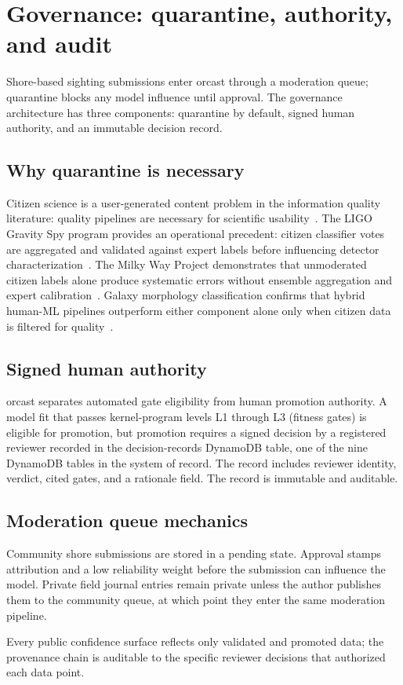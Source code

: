 \section{Governance: quarantine, authority, and audit}

Shore-based sighting submissions enter orcast through a moderation queue; quarantine blocks any model influence until approval. The governance architecture has three components: quarantine by default, signed human authority, and an immutable decision record.

\subsection{Why quarantine is necessary}

Citizen science is a user-generated content problem in the information quality literature: quality pipelines are necessary for scientific usability~\cite{arxiv190508289}. The LIGO Gravity Spy program provides an operational precedent: citizen classifier votes are aggregated and validated against expert labels before influencing detector characterization~\cite{arxiv161104596}. The Milky Way Project demonstrates that unmoderated citizen labels alone produce systematic errors without ensemble aggregation and expert calibration~\cite{arxiv14062692}. Galaxy morphology classification confirms that hybrid human-ML pipelines outperform either component alone only when citizen data is filtered for quality~\cite{arxiv14097935}.

\subsection{Signed human authority}

orcast separates automated gate eligibility from human promotion authority. A model fit that passes kernel-program levels L1 through L3 (fitness gates) is eligible for promotion, but promotion requires a signed decision by a registered reviewer recorded in the decision-records DynamoDB table, one of the nine DynamoDB tables in the system of record. The record includes reviewer identity, verdict, cited gates, and a rationale field. The record is immutable and auditable.

\subsection{Moderation queue mechanics}

Community shore submissions are stored in a pending state. Approval stamps attribution and a low reliability weight before the submission can influence the model. Private field journal entries remain private unless the author publishes them to the community queue, at which point they enter the same moderation pipeline.

Every public confidence surface reflects only validated and promoted data; the provenance chain is auditable to the specific reviewer decisions that authorized each data point.
